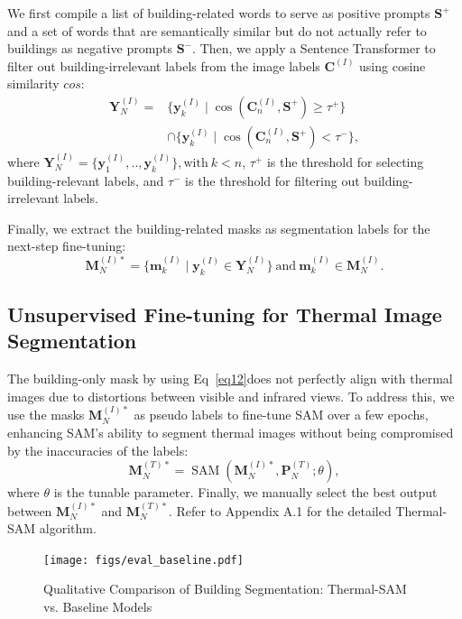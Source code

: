 \documentclass{article}
\theoremstyle{plain}
\theoremstyle{definition}
\theoremstyle{remark}
\begin{document}
We first compile a list of building-related words to serve as positive prompts $\bm{S}^+$ and a set of words that are semantically similar but do not actually refer to buildings as negative prompts $\bm{S}^-$. Then, we apply a Sentence Transformer to filter out building-irrelevant labels from the image labels $\bm{C}^{(I)}$ using cosine similarity $cos$: 
\begin{equation} 
\begin{aligned} 
\bm{Y}^{(I)}_N = &\{\bm{y}^{(I)}_k \mid \cos(\bm{C}^{(I)}_n, \bm{S}^+)
\geq \tau^+ \} \\
&\cap \{\bm{y}^{(I)}_k \mid \cos(\bm{C}^{(I)}_n, \bm{S}^+) < \tau^- \}, 
\end{aligned} 
\label{eq6} 
\end{equation}
where $\bm{Y}^{(I)}_N = \{\bm{y}^{(I)}_1,..,\bm{y}^{(I)}_k\}, \text{with} \ k<n$, $\tau^+$ is the threshold for selecting building-relevant labels, and $\tau^-$ is the threshold for filtering out building-irrelevant labels. 

Finally, we extract the building-related masks as segmentation labels for the next-step fine-tuning:
\begin{equation} 
\bm{M}^{(I)*}_N = \{ \bm{m}^{(I)}_k\mid \bm{y}^{(I)}_k \in \bm{Y}^{(I)}_N \} \ \text{and}\  \bm{m}^{(I)}_k \in \bm{M}^{(I)}_N.
\label{eq7} \end{equation}
\subsection{Unsupervised Fine-tuning for Thermal Image Segmentation}

The building-only mask by using Eq~\eqref{eq12}does not perfectly align with thermal images due to distortions between visible and infrared views. To address this, we use the masks $\bm{M}^{(I)*}_N$ as pseudo labels to ﬁne‐tune SAM over a few epochs, enhancing SAM’s ability to segment thermal images without being compromised by the inaccuracies of the labels:
\begin{equation}
\bm{M}^{(T)*}_N = \operatorname{SAM}(\bm{M}^{(I)*}_N,\bm{P}^{(T)}_N; \theta), 
\label{eq8} \end{equation}
where $\theta$ is the tunable parameter. Finally, we manually select the best output between $\bm{M}^{(I)*}_N$ and $\bm{M}^{(T)*}_N$. Refer to Appendix A.1 for the detailed Thermal-SAM algorithm.
\begin{figure}[htbp]
\centering
\texttt{[image: figs/eval\_baseline.pdf]}
\caption{Qualitative Comparison of Building Segmentation: Thermal-SAM vs. Baseline Models}
\label{fig:segresults}
\end{figure}
\end{document}
